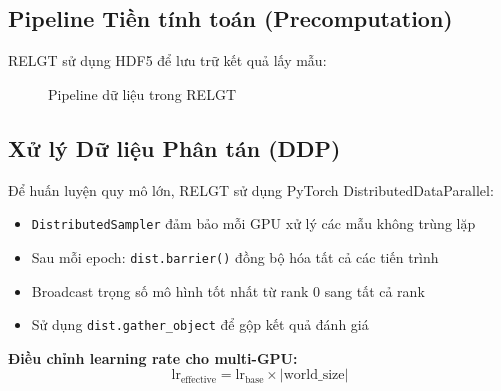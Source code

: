 \documentclass[12pt,a4paper]{article}
\begin{document}
\subsection{Pipeline Tiền tính toán (Precomputation)}

RELGT sử dụng HDF5 để lưu trữ kết quả lấy mẫu:

\begin{figure}[h!]
\centering
{}
\caption{Pipeline dữ liệu trong RELGT}
\end{figure}

\subsection{Xử lý Dữ liệu Phân tán (DDP)}

Để huấn luyện quy mô lớn, RELGT sử dụng PyTorch DistributedDataParallel:
\begin{itemize}
  \item \texttt{DistributedSampler} đảm bảo mỗi GPU xử lý các mẫu không trùng lặp
  \item Sau mỗi epoch: \texttt{dist.barrier()} đồng bộ hóa tất cả các tiến trình
  \item Broadcast trọng số mô hình tốt nhất từ rank 0 sang tất cả rank
  \item Sử dụng \texttt{dist.gather\_object} để gộp kết quả đánh giá
\end{itemize}

\textbf{Điều chỉnh learning rate cho multi-GPU:}
\begin{equation}
  \text{lr}_\text{effective} = \text{lr}_\text{base} \times |\text{world\_size}|
\end{equation}
\end{document}
